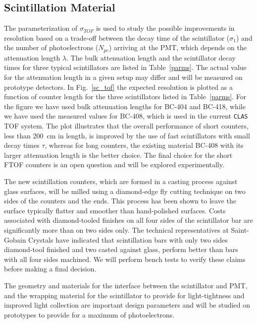\subsection{Scintillation Material}

The parameterization of $\sigma_{TOF}$ is used to study the possible 
improvements in resolution based on a trade-off between the decay time of 
the scintillator ($\sigma_1$) and the number of photoelectrons ($N_{pe}$) 
arriving at the PMT, which depends on the attenuation length $\lambda$.  The 
bulk attenuation length and the scintillator decay times for three typical 
scintillators are listed in Table~\ref{parms}.  The actual value for the 
attenuation length in a given setup may differ and will be measured on 
prototype detectors. In Fig.~\ref{sc_tof} the expected resolution is plotted 
as a function of counter length for the three scintillators listed in 
Table~\ref{parms}. For the figure we have used bulk attenuation lengths for 
BC-404 and BC-418, while we have used the measured values for BC-408, which 
is used in the current {\tt CLAS} TOF system.  The plot illustrates that 
the overall performance of short counters, less than 200~cm in length, is 
improved by the use of fast scintillators with small decay times $\tau$, 
whereas for long counters, the existing material BC-408 with its larger 
attenuation length is the better choice.  The final choice for the short 
FTOF counters is an open question and will be explored experimentally.  

The new scintillation counters, which are formed in a casting process
against glass surfaces, will be milled using a diamond-edge fly cutting 
technique on two sides of the counters and the ends.  This process has been 
shown to leave the surface typically flatter and smoother than hand-polished 
surfaces.  Costs associated with diamond-tooled finishes on all four
sides of the scintillator bar are significantly more than on two sides only.
The technical representatives at Saint-Gobain Crystals have indicated that
scintillation bars with only two sides diamond-tool finished and two casted
against glass, perform better than bars with all four sides machined.  We
will perform bench tests to verify these claims before making a final decision.

The geometry and materials for the interface between the scintillator and PMT, 
and the wrapping material for the scintillator to provide for light-tightness 
and improved light collection are important design parameters and will be 
studied on prototypes to provide for a maximum of photoelectrons.

